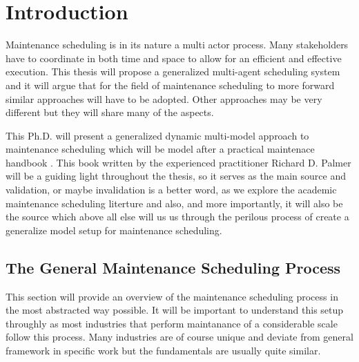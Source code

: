 \chapter{Introduction}
Maintenance scheduling is in its nature a multi actor process. Many stakeholders have to coordinate in both time and space to allow for an
efficient and effective execution. This thesis will propose a generalized multi-agent scheduling system and it will argue that for the field of
maintenance scheduling to more forward similar approaches will have to be adopted. Other approaches may be very different but they will share many 
of the aspects. 

This Ph.D. will present a generalized dynamic multi-model approach to maintenance scheduling which will be model after a practical maintenace handbook \cite{palmer_maintenance_2019}.
This book written by the experienced practitioner Richard D. Palmer will be a guiding light throughout the thesis, so it serves as the main source and validation, 
or maybe invalidation is a better word, as we explore the academic maintenance scheduling literture and also, and more importantly, it will also be the source 
which above all else will us us through the perilous process of create a generalize model setup for maintenance scheduling.


\section{The General Maintenance Scheduling Process}
This section will provide an overview of the maintenance scheduling process in the most abstracted way possible. It will be important to understand this setup
throughly as most industries that perform maintanance of a considerable scale follow this process. Many industries are of course unique and deviate
from general framework in specific work but the fundamentals are usually quite similar. 

